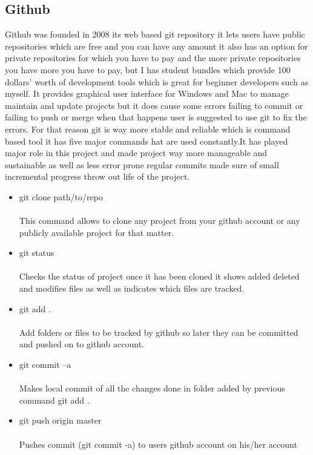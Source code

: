 \subsection{Github}
\bigbreak
Github was founded in 2008 its web based git repository it lets users have public repositories which are free and you can have any amount it also has an option for private repositories for which you have to pay and the more private repositories you have more you have to pay, but I has student bundles which provide 100 dollars’ worth of development tools which is great for beginner developers such as myself. It provides graphical user interface for Windows and Mac to manage maintain and update projects but it does cause some errors failing to commit or failing to push or merge when that happens user is suggested to use git to fix the errors. For that reason git is way more stable and reliable which is command based tool it has five major commands hat are used constantly.It has played major role in this project and made project way more manageable and sustainable as well as less error prone regular commits made sure of small incremental progress throw out life of the project.

\begin{itemize}
	
\item git clone path/to/repo \\
\\This command allows to clone any project from your github account or any publicly available project for that matter.

\item git status \\
\\Checks the status of project once it has been cloned it shows added deleted and modifies files as well as indicates which files are tracked.

\item git add . \\ 
\\Add folders or files to be tracked by github so later they can be committed and pushed on to github account.

\item git commit –a \\
\\Makes local commit of all the changes done in folder added by previous command git add .

\item git push origin master \\ 
\\ Pushes commit (git commit -a) to users github account on his/her account

\end{itemize}



